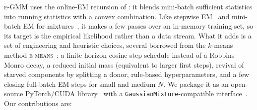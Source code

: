 \documentclass[10pt]{article} %
\newcommand{\egmm}{\textsc{e-GMM}}
\newcommand{\emeans}{\textsc{e-means}}
\begin{document}
\egmm{} uses the online-EM recursion of \citet{cappe2009online}: it blends mini-batch sufficient statistics into running statistics with a convex combination. Like stepwise EM~\citep{liang2009online} and mini-batch EM for mixtures~\citep{nguyen2020minibatch}, it makes a few passes over an in-memory training set, so its target is the empirical likelihood rather than a data stream. What it adds is a set of engineering and heuristic choices, several borrowed from the $k$-means method \emeans{}~\citep{bessa2026emeans}: a finite-horizon cosine step schedule instead of a Robbins--Monro decay, a reduced initial mass (equivalent to larger first steps), revival of starved components by splitting a donor, rule-based hyperparameters, and a few closing full-batch EM steps for small and medium $N$. We package it as an open-source PyTorch/CUDA library~\citep{paszke2019pytorch} with a \texttt{GaussianMixture}-compatible interface~\citep{pedregosa2011scikit}. Our contributions are:
\end{document}
